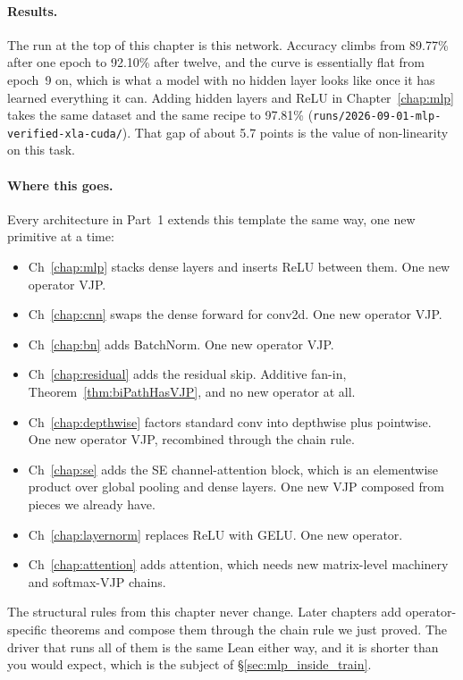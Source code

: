 \paragraph{Results.}
The run at the top of this chapter is this network. Accuracy climbs from
89.77\% after one epoch to 92.10\% after twelve, and the curve is
essentially flat from epoch~9 on, which is what a model with no hidden
layer looks like once it has learned everything it can. Adding hidden layers and ReLU in Chapter~\ref{chap:mlp} takes the same
dataset and the same recipe to 97.81\% (\texttt{runs/2026-09-01-mlp-verified-xla-cuda/}). That gap of about 5.7 points is the value of
non-linearity on this task.

\paragraph{Where this goes.}
Every architecture in Part~1 extends this template the same way, one
new primitive at a time:

\begin{itemize}
  \item Ch~\ref{chap:mlp} stacks dense layers and inserts ReLU between
    them. One new operator VJP.
  \item Ch~\ref{chap:cnn} swaps the dense forward for conv2d. One new
    operator VJP.
  \item Ch~\ref{chap:bn} adds BatchNorm. One new operator VJP.
  \item Ch~\ref{chap:residual} adds the residual skip. Additive fan-in,
    Theorem~\ref{thm:biPathHasVJP}, and no new operator at all.
  \item Ch~\ref{chap:depthwise} factors standard conv into depthwise
    plus pointwise. One new operator VJP, recombined through the chain
    rule.
  \item Ch~\ref{chap:se} adds the SE channel-attention block, which is
    an elementwise product over global pooling and dense layers. One new
    VJP composed from pieces we already have.
  \item Ch~\ref{chap:layernorm} replaces ReLU with GELU. One new
    operator.
  \item Ch~\ref{chap:attention} adds attention, which needs new
    matrix-level machinery and softmax-VJP chains.
\end{itemize}
 The structural
rules from this chapter never change. Later chapters add
operator-specific theorems and compose them through the chain rule we
just proved. The driver that runs all of them is the same Lean either
way, and it is shorter than you would expect, which is the subject of
\S\ref{sec:mlp_inside_train}.

